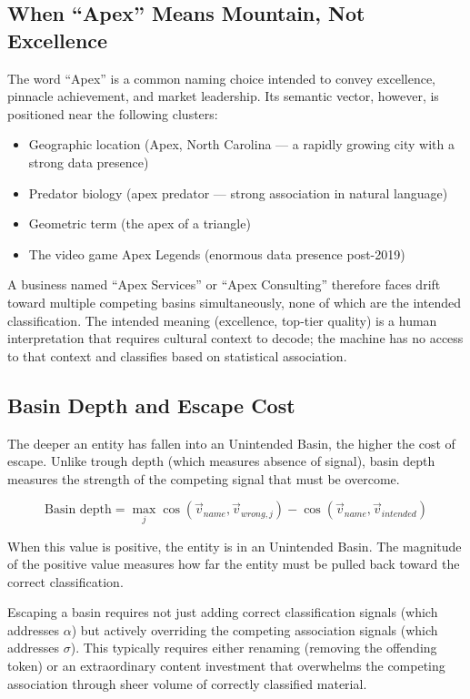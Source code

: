 \documentclass[12pt, openany]{book}
\theoremstyle{thmstyle}
\theoremstyle{defstyle}
\begin{document}
\subsection{When ``Apex'' Means Mountain, Not Excellence}

The word ``Apex'' is a common naming choice intended to convey excellence, pinnacle achievement, and market leadership. Its semantic vector, however, is positioned near the following clusters:

\begin{itemize}[leftmargin=1.5em]
  \item Geographic location (Apex, North Carolina --- a rapidly growing city with a strong data presence)
  \item Predator biology (apex predator --- strong association in natural language)
  \item Geometric term (the apex of a triangle)
  \item The video game Apex Legends (enormous data presence post-2019)
\end{itemize}

A business named ``Apex Services'' or ``Apex Consulting'' therefore faces drift toward multiple competing basins simultaneously, none of which are the intended classification. The intended meaning (excellence, top-tier quality) is a human interpretation that requires cultural context to decode; the machine has no access to that context and classifies based on statistical association.

\subsection{Basin Depth and Escape Cost}

The deeper an entity has fallen into an Unintended Basin, the higher the cost of escape. Unlike trough depth (which measures absence of signal), basin depth measures the strength of the competing signal that must be overcome.

\begin{equation}
\text{Basin depth} = \max_j \cos(\vec{v}_{name}, \vec{v}_{wrong,j}) - \cos(\vec{v}_{name}, \vec{v}_{intended})
\label{eq:basin_depth}
\end{equation}

When this value is positive, the entity is in an Unintended Basin. The magnitude of the positive value measures how far the entity must be pulled back toward the correct classification.

Escaping a basin requires not just adding correct classification signals (which addresses $\alpha$) but actively overriding the competing association signals (which addresses $\sigma$). This typically requires either renaming (removing the offending token) or an extraordinary content investment that overwhelms the competing association through sheer volume of correctly classified material.
\end{document}
